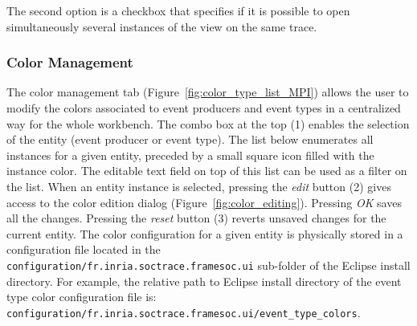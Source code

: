 \documentclass[twoside]{article}
\begin{document}
\begin{sloppypar}
The second option is a checkbox that specifies if it is possible to open simultaneously several instances of the view on the same trace.

\subsubsection{Color Management}
\label{subsec:colors}

The color management tab (Figure~\ref{fig:color_type_list_MPI}) allows the user to modify the colors associated to event producers and event types in a centralized way for the whole workbench.
The combo box at the top (\num{1}) enables the selection of the entity (event producer or event type).
The list below enumerates all instances for a given entity, preceded by a small square icon filled with the instance color.
The editable text field on top of this list can be used as a filter on the list.
When an entity instance is selected, pressing the \emph{edit} button (\num{2}) gives access to the color edition dialog (Figure~\ref{fig:color_editing}).
Pressing \emph{OK} saves all the changes.
Pressing the \emph{reset} button (\num{3}) reverts unsaved changes for the current entity.
The color configuration for a given entity is physically stored in a configuration file located in the \texttt{configuration/fr.inria.soctrace.framesoc.ui} sub-folder of the Eclipse install directory.
For example, the relative path to Eclipse install directory of the event type color configuration file is:
\texttt{configuration/fr.inria.soctrace.framesoc.ui/event\_type\_colors}.


\end{sloppypar}
\end{document}
